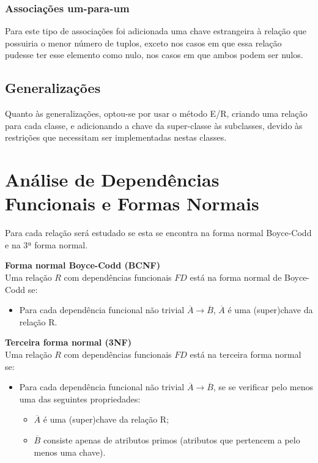 \documentclass[article, a4paper, 12pt, oneside]{memoir}
\begin{document}
\subsection{Associações um-para-um}
Para este tipo de associações foi adicionada uma chave estrangeira à relação que possuiria o menor número de tuplos, exceto nos casos em que essa relação pudesse ter esse elemento como nulo, nos casos em que ambos podem ser nulos.

\section{Generalizações}
Quanto às generalizações, optou-se por usar o método E/R, criando uma relação para cada classe, e adicionando a chave da super-classe às subclasses, devido às restrições que necessitam ser implementadas nestas classes.

\newpage
\chapter[Análise de DFs e FNs][Análise de DFs e FNs]{Análise de Dependências Funcionais e Formas Normais} \label{\thechapter}

Para cada relação será estudado se esta se encontra na forma normal Boyce-Codd e na 3ª forma normal.

\textbf{Forma normal Boyce-Codd (BCNF)}\\
Uma relação $R$ com dependências funcionais $FD$ está na forma normal de Boyce-Codd se:
\begin{itemize}
	\item Para cada dependência funcional não trivial $\overline{A}\rightarrow\overline{B}$, $\overline{A}$ é uma (super)chave da relação R.
\end{itemize}

\textbf{Terceira forma normal (3NF)}\\
Uma relação $R$ com dependências funcionais $FD$ está na terceira forma normal se:
\begin{itemize}
	\item Para cada dependência funcional não trivial $\overline{A}\rightarrow\overline{B}$, se se verificar pelo menos uma das seguintes propriedades:
	\begin{itemize}
		\item $\overline{A}$ é uma (super)chave da relação R;
		\item $\overline{B}$ consiste apenas de atributos primos (atributos que pertencem a pelo menos uma chave).
	\end{itemize}
\end{itemize}
\end{document}
